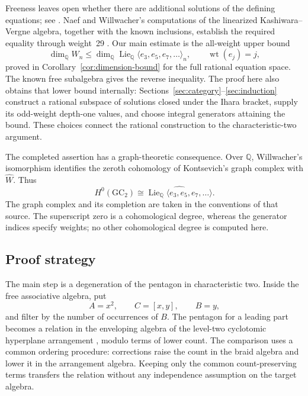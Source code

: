 \documentclass[11pt]{article}
\newcommand{\Q}{\mathbb Q}
\newcommand{\Lie}{\operatorname{Lie}}
\DeclareMathOperator{\wt}{wt}
\theoremstyle{definition}
\theoremstyle{remark}
\numberwithin{equation}{section}
\begin{document}
Freeness leaves open whether there are additional solutions of the
defining equations; see \cite[Section~9]{Willwacher}.
Naef and Willwacher's computations of the linearized
Kashiwara--Vergne algebra, together with the known inclusions,
establish the required equality through weight~29
\cite[Theorem~5 and Corollary~7]{NaefWillwacher}.
Our main estimate is the all-weight upper bound
\[
 \dim_{\Q}W_n\leq
 \dim_{\Q}\Lie_{\Q}\langle e_3,e_5,e_7,\ldots\rangle_n,
 \qquad \wt(e_j)=j,
\]
proved in Corollary~\ref{cor:dimension-bound} for the full rational
equation space.  The known free subalgebra gives the reverse inequality.
The proof here also obtains that lower bound internally:
Sections~\ref{sec:category}--\ref{sec:induction} construct a rational
subspace of solutions closed under the Ihara bracket, supply its
odd-weight depth-one values, and choose integral generators attaining
the bound.  These choices connect the rational construction to the
characteristic-two argument.

The completed assertion has a graph-theoretic consequence.  Over
\(\Q\), Willwacher's isomorphism
\cite[Theorem~1.1]{Willwacher} identifies the zeroth cohomology of
Kontsevich's graph complex with \(\widehat W\).  Thus
\[
 H^0(\mathrm{GC}_2)\cong
 \widehat{\Lie_{\Q}\langle e_3,e_5,e_7,\ldots\rangle}.
\]
The graph complex and its completion are taken in the conventions of
that source.  The superscript zero is a cohomological degree, whereas
the generator indices specify weights; no other cohomological degree
is computed here.

\subsection{Proof strategy}

The main step is a degeneration of the pentagon in characteristic two.
Inside the free associative algebra, put
\[
 A=x^2,\qquad C=[x,y],\qquad B=y,
\]
and filter by the number of occurrences of \(B\).
The pentagon for a leading part becomes a relation in the enveloping
algebra of the level-two cyclotomic hyperplane arrangement
\cite[Section~1.4]{Enriquez}, modulo terms of lower count.
The comparison uses a common ordering procedure: corrections
raise the count in the braid algebra and lower it in the arrangement
algebra.  Keeping only the common count-preserving terms transfers the
relation without any independence assumption on the target algebra.
\end{document}
